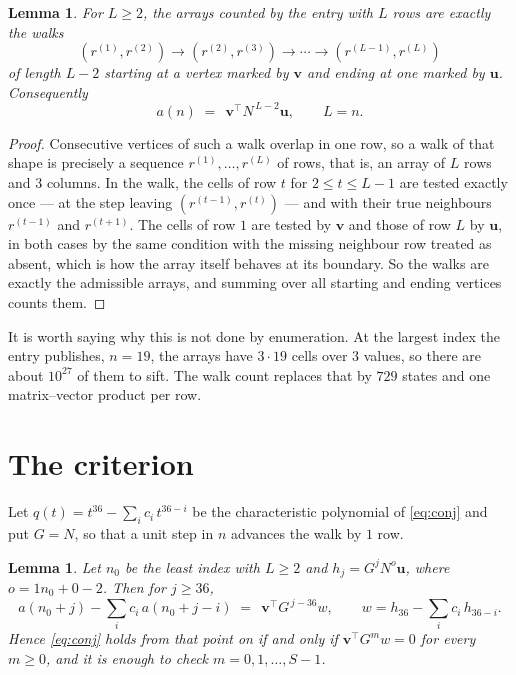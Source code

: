 \documentclass[11pt,a4paper]{article}
\theoremstyle{plain}
\newtheorem{lemma}[theorem]{Lemma}
\theoremstyle{definition}
\begin{document}
\begin{lemma}\label{lem:walk}
For $L\ge2$, the arrays counted by the entry with $L$ rows are exactly the walks
\[
(r^{(1)},r^{(2)})\to(r^{(2)},r^{(3)})\to\cdots\to(r^{(L-1)},r^{(L)})
\]
of length $L-2$ starting at a vertex marked by $\mathbf{v}$ and ending at one marked by
$\mathbf{u}$. Consequently
\[
a(n)\;=\;\,\mathbf{v}^{\!\top}N^{\,L-2}\mathbf{u},\qquad L=n .
\]
\end{lemma}

\begin{proof}
Consecutive vertices of such a walk overlap in one row, so a walk of that shape is
precisely a sequence $r^{(1)},\dots,r^{(L)}$ of rows, that is, an array of $L$ rows
and $3$ columns. In the walk, the cells of row $t$ for $2\le t\le L-1$ are tested
exactly once --- at the step leaving $(r^{(t-1)},r^{(t)})$ --- and with their true
neighbours $r^{(t-1)}$ and $r^{(t+1)}$. The cells of row $1$ are tested by
$\mathbf{v}$ and those of row $L$ by $\mathbf{u}$, in both cases by the same condition
with the missing neighbour row treated as absent, which is how the array itself behaves at
its boundary. So the walks are exactly the admissible arrays, and summing over all starting
and ending vertices counts them.
\end{proof}


It is worth saying why this is not done by enumeration. At the largest index the entry
publishes, $n=19$, the arrays have $3\cdot19$ cells over
$3$ values, so there are about $10^{27}$ of them to sift. The
walk count replaces that by $729$ states and one matrix--vector product per row.
\section{The criterion}

Let $q(t)=t^{36}-\sum_i c_i\,t^{36-i}$ be the characteristic polynomial of
\eqref{eq:conj} and put $G=N$, so that a unit step in $n$ advances the walk by
$1$ row.

\begin{lemma}\label{lem:crit}
Let $n_0$ be the least index with $L\ge2$ and $h_j=G^{j}N^{o}\mathbf{u}$, where
$o=1n_0+0-2$. Then for $j\ge36$,
\[
a(n_0+j)-\sum_i c_i\,a(n_0+j-i)\;=\;\,\mathbf{v}^{\!\top}G^{\,j-36}w,
\qquad w=h_{36}-\sum_i c_i\,h_{36-i} .
\]
Hence \eqref{eq:conj} holds from that point on if and only if
$\mathbf{v}^{\!\top}G^{m}w=0$ for every $m\ge0$, and it is enough to check
$m=0,1,\dots,S-1$.
\end{lemma}
\end{document}
